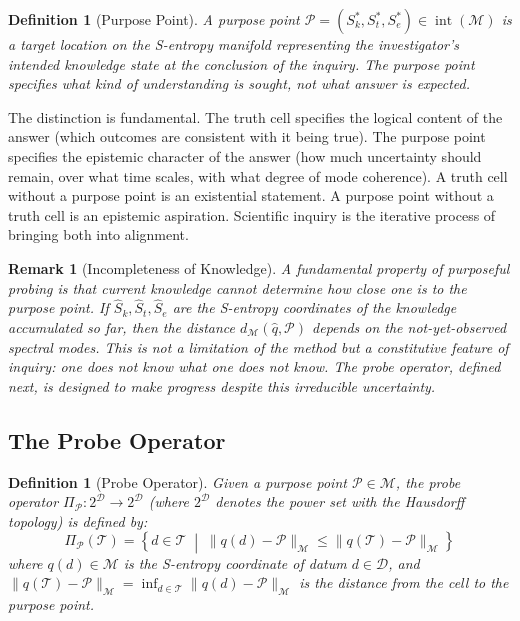 \documentclass[10pt,twocolumn]{article}
\newtheorem{definition}[theorem]{Definition}
\newtheorem{remark}[theorem]{Remark}
\DeclareMathOperator{\interior}{int}
\newcommand{\ProbeOp}{\Pi_\mathcal{P}}
\newcommand{\TruthCell}{\mathcal{T}}
\newcommand{\PurposePoint}{\mathcal{P}}
\newcommand{\DataSpace}{\mathcal{D}}
\newcommand{\ManifoldM}{\mathcal{M}}
\begin{document}
\begin{definition}[Purpose Point]
\label{def:purpose-point}
A \emph{purpose point} $\PurposePoint = (S_k^*, S_t^*, S_e^*)
\in \interior(\ManifoldM)$ is a target location on the S-entropy manifold
representing the investigator's intended knowledge state at the conclusion
of the inquiry. The purpose point specifies \emph{what kind of understanding}
is sought, not \emph{what answer} is expected.
\end{definition}

The distinction is fundamental. The truth cell specifies the logical
content of the answer (which outcomes are consistent with it being true).
The purpose point specifies the epistemic character of the answer
(how much uncertainty should remain, over what time scales,
with what degree of mode coherence).
A truth cell without a purpose point is an existential statement.
A purpose point without a truth cell is an epistemic aspiration.
Scientific inquiry is the iterative process of bringing both into alignment.

\begin{remark}[Incompleteness of Knowledge]
\label{rem:incompleteness}
A fundamental property of purposeful probing is that current knowledge
cannot determine how close one is to the purpose point.
If $\hat{S}_k, \hat{S}_t, \hat{S}_e$ are the S-entropy coordinates
of the knowledge accumulated so far, then the distance $d_\ManifoldM(\hat{q}, \PurposePoint)$
depends on the \emph{not-yet-observed} spectral modes.
This is not a limitation of the method but a constitutive feature of inquiry:
one does not know what one does not know.
The probe operator, defined next, is designed to make progress
despite this irreducible uncertainty.
\end{remark}

\subsection{The Probe Operator}

\begin{definition}[Probe Operator]
\label{def:probe}
Given a purpose point $\PurposePoint \in \ManifoldM$,
the \emph{probe operator} $\ProbeOp : 2^\DataSpace \to 2^\DataSpace$
(where $2^\DataSpace$ denotes the power set with the Hausdorff topology)
is defined by:
\begin{equation}
\ProbeOp(\TruthCell) = \left\{
  d \in \TruthCell \;\middle|\;
  \|q(d) - \PurposePoint\|_{\ManifoldM} \leq \|q(\TruthCell) - \PurposePoint\|_{\ManifoldM}
\right\}
\label{eq:probe-def}
\end{equation}
where $q(d) \in \ManifoldM$ is the S-entropy coordinate of datum $d \in \DataSpace$,
and $\|q(\TruthCell) - \PurposePoint\|_{\ManifoldM} = \inf_{d \in \TruthCell} \|q(d) - \PurposePoint\|_{\ManifoldM}$
is the distance from the cell to the purpose point.
\end{definition}
\end{document}
